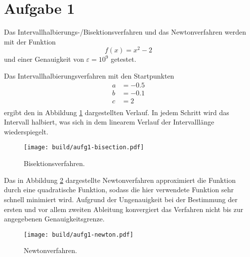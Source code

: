 \section*{Aufgabe 1}
Das Intervallhalbierungs-/Bisektionsverfahren und das Newtonverfahren werden
mit der Funktion
\begin{equation*}
  f\!\left(x\right) = x^2 - 2
\end{equation*}
und einer Genauigkeit von $\varepsilon = 10^9$ getestet.

Das Intervallhalbierungsverfahren mit den Startpunkten
\begin{align*}
  a &= \num{-0.5} \\
  b &= \num{-0.1} \\
  c &= \num{2} \\
\end{align*}
ergibt den in Abbildung \ref{fig:A1-Bisektionsverfahren} dargestellten Verlauf.
In jedem Schritt wird das Intervall halbiert, was sich in dem linearem Verlauf
der Intervalllänge wiederspiegelt.
\begin{figure}
  \centering
  \texttt{[image: build/aufg1-bisection.pdf]}
  \caption{Bisektionsverfahren.}
  \label{fig:A1-Bisektionsverfahren}
\end{figure}
Das in Abbildung \ref{fig:A1-Newtonverfahren} dargestellte Newtonverfahren approximiert
die Funktion durch eine quadratische Funktion,
sodass die hier verwendete Funktion sehr schnell minimiert wird.
Aufgrund der Ungenauigkeit bei der Bestimmung der ersten und vor allem zweiten
Ableitung konvergiert das Verfahren nicht bis zur angegebenen Genauigkeitsgrenze.
\begin{figure}
  \centering
  \texttt{[image: build/aufg1-newton.pdf]}
  \caption{Newtonverfahren.}
  \label{fig:A1-Newtonverfahren}
\end{figure}
